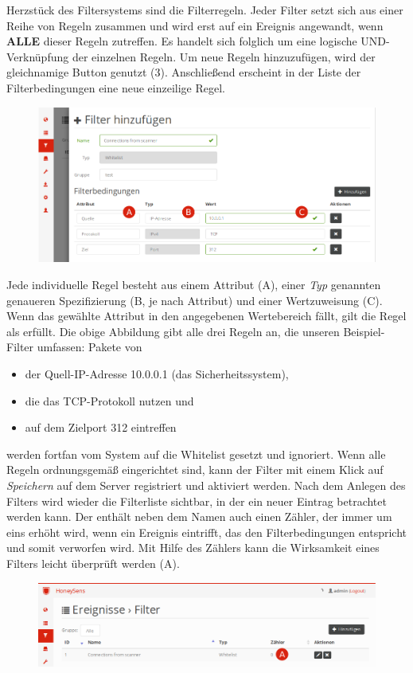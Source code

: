 \documentclass[12pt]{article}
\begin{document}
Herzstück des Filtersystems sind die Filterregeln. Jeder Filter setzt sich aus einer Reihe von Regeln zusammen und wird erst auf ein Ereignis angewandt, wenn \textbf{ALLE} dieser Regeln zutreffen. Es handelt sich folglich um eine logische UND-Verknüpfung der einzelnen Regeln. Um neue Regeln hinzuzufügen, wird der gleichnamige Button genutzt (3). Anschließend erscheint in der Liste der Filterbedingungen eine neue einzeilige Regel.

\begin{figure}[h]
				\centering
				\includegraphics[width=\textwidth]{./graphics/howto-event-filter-5.png}
				\label{fig:howto-event-filter-5}
\end{figure}

Jede individuelle Regel besteht aus einem Attribut (A), einer \textit{Typ} genannten genaueren Spezifizierung (B, je nach Attribut) und einer Wertzuweisung (C). Wenn das gewählte Attribut in den angegebenen Wertebereich fällt, gilt die Regel als erfüllt. Die obige Abbildung gibt alle drei Regeln an, die unseren Beispiel-Filter umfassen:
Pakete von
\begin{itemize}
				\item der Quell-IP-Adresse 10.0.0.1 (das Sicherheitssystem),
				\item die das TCP-Protokoll nutzen und
				\item auf dem Zielport 312 eintreffen
\end{itemize}
werden fortfan vom System auf die Whitelist gesetzt und ignoriert. Wenn alle Regeln ordnungsgemäß eingerichtet sind, kann der Filter mit einem Klick auf \textit{Speichern} auf dem Server registriert und aktiviert werden. Nach dem Anlegen des Filters wird wieder die Filterliste sichtbar, in der ein neuer Eintrag betrachtet werden kann. Der enthält neben dem Namen auch einen Zähler, der immer um eins erhöht wird, wenn ein Ereignis eintrifft, das den Filterbedingungen entspricht und somit verworfen wird. Mit Hilfe des Zählers kann die Wirksamkeit eines Filters leicht überprüft werden (A).

\begin{figure}[h]
				\centering
				\includegraphics[width=\textwidth]{./graphics/howto-event-filter-6.png}
				\label{fig:howto-event-filter-6}
\end{figure}
\end{document}
